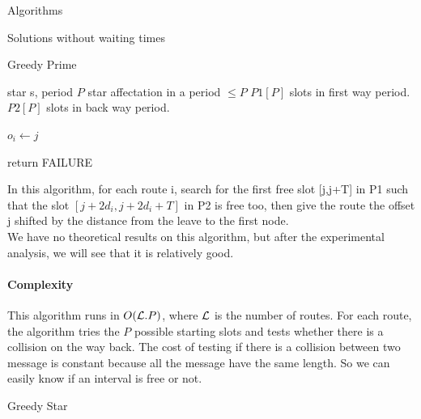 \documentclass[a4paper,10pt]{report}
\begin{document}
\begin{chapter}{Algorithms}
\begin{section}{Solutions without waiting times}
\begin{subsection}{Greedy Prime}
\begin{algorithm}[H]
\caption{Greedy Prime assignment}
\begin{algorithmic}
\REQUIRE star s, period $P$
\ENSURE star affectation in a period $\leq P$ 
\STATE $P1[P]$ slots in first way period.
\STATE $P2[P]$ slots in back way period.




\STATE $o_i \leftarrow j$
\ENDIF

\ENDIF
{}
\STATE return FAILURE
\ENDIF
\ENDFOR

\ENDFOR

\end{algorithmic}
\end{algorithm}


In this algorithm, for each route i, search for the first free slot [j,j+T] in P1 such that the slot $[j + 2d_i,j + 2d_i+T]$ in P2 is free too,
then give the route the offset j shifted by the distance from the leave to the first node.\\

We have no theoretical results on this algorithm, but after the experimental analysis, we will see that it is relatively good.


\paragraph{Complexity}
This algorithm runs in $O({\cal L}.P)$, where ${\cal L}$ is the number of routes. For each route, the algorithm tries the $P$ possible
starting slots and tests whether there is a collision on the way back.
The cost of testing if there is a collision between two message is constant because all the message have the same length. So we can easily know if an interval is free or not.

\end{subsection}




\begin{subsection}{Greedy Star}
%  
% 
%  
%  



\end{subsection}
\end{section}
\end{chapter}
\end{document}
